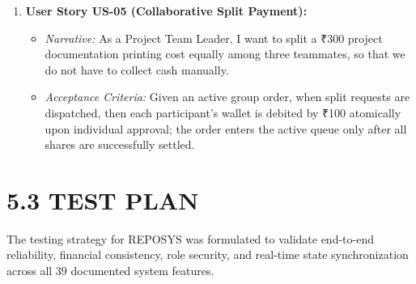 \documentclass[12pt,a4paper,oneside]{report}
\begin{document}
\begin{enumerate}[leftmargin=0.35in, itemsep=4pt]
\begin{itemize}[itemsep=1pt]
      \item \textit{Narrative:} As an Administrator, I want to update paper and binding tariffs on the live system, so that prices reflect changes in institutional procurement costs without server restarts.
      \item \textit{Acceptance Criteria:} Given an authenticated Admin role, when the tariff configuration is updated via the dashboard, then new rates are committed immediately to \texttt{SystemConfig} and reflected in all subsequent order estimations.
    \end{itemize}
  \item \textbf{User Story US-05 (Collaborative Split Payment):}
    \begin{itemize}[itemsep=1pt]
      \item \textit{Narrative:} As a Project Team Leader, I want to split a ₹300 project documentation printing cost equally among three teammates, so that we do not have to collect cash manually.
      \item \textit{Acceptance Criteria:} Given an active group order, when split requests are dispatched, then each participant's wallet is debited by ₹100 atomically upon individual approval; the order enters the active queue only after all shares are successfully settled.
    \end{itemize}
\end{enumerate}

\section{5.3 TEST PLAN}
The testing strategy for REPOSYS was formulated to validate end-to-end reliability, financial consistency, role security, and real-time state synchronization across all 39 documented system features.
\end{document}
